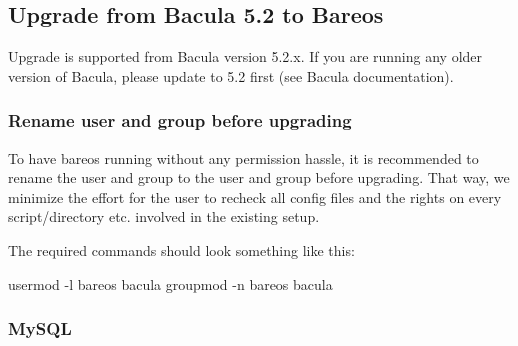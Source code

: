 \subsection{Upgrade from Bacula 5.2 to Bareos}
\label{upgrade-from-bacula-to-bareos}

Upgrade is supported from Bacula version 5.2.x. If you are running any older version of Bacula, please update to 5.2 first (see Bacula documentation).





\subsubsection{Rename user and group before upgrading}

To have bareos running without any permission hassle, it is recommended to rename the user and group  to the user and group  before upgrading. That way, we minimize the effort for the user to recheck all config files and the rights on every script/directory etc. involved in the existing setup.

The required commands should look something like this:

\begin{commands}{}
usermod  -l bareos bacula
groupmod -n bareos bacula
\end{commands}

\subsubsection{MySQL}

